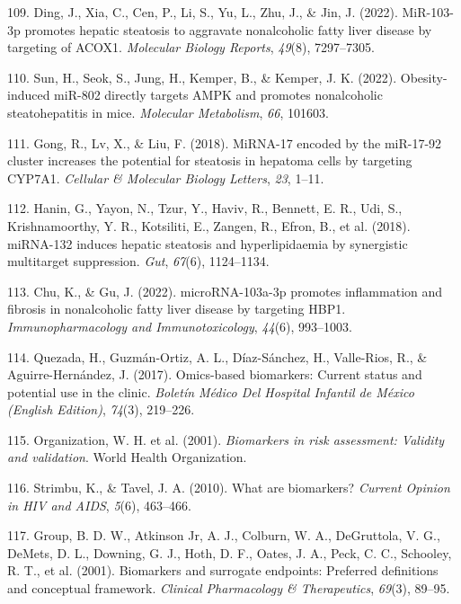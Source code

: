 \documentclass[
  11pt,
  letterpaper,
]{book}
\newlength{\cslhangindent}
\newenvironment{CSLReferences}[2] %
 {\begin{list}{}{%
  \setlength{\itemindent}{0pt}
  \setlength{\leftmargin}{0pt}
  \setlength{\parsep}{0pt}
  \ifodd #1
   \setlength{\leftmargin}{\cslhangindent}
   \setlength{\itemindent}{-1\cslhangindent}
  \fi
  \setlength{\itemsep}{#2\baselineskip}}}
 {\end{list}}
\begin{document}
\begin{CSLReferences}{1}{0}
109. Ding, J., Xia, C., Cen, P., Li, S., Yu, L., Zhu, J., \& Jin, J.
(2022). MiR-103-3p promotes hepatic steatosis to aggravate nonalcoholic
fatty liver disease by targeting of ACOX1. \emph{Molecular Biology
Reports}, \emph{49}(8), 7297--7305.

110. Sun, H., Seok, S., Jung, H., Kemper, B., \& Kemper, J. K. (2022).
Obesity-induced miR-802 directly targets AMPK and promotes nonalcoholic
steatohepatitis in mice. \emph{Molecular Metabolism}, \emph{66}, 101603.

111. Gong, R., Lv, X., \& Liu, F. (2018). MiRNA-17 encoded by the
miR-17-92 cluster increases the potential for steatosis in hepatoma
cells by targeting CYP7A1. \emph{Cellular \& Molecular Biology Letters},
\emph{23}, 1--11.

112. Hanin, G., Yayon, N., Tzur, Y., Haviv, R., Bennett, E. R., Udi, S.,
Krishnamoorthy, Y. R., Kotsiliti, E., Zangen, R., Efron, B., et al.
(2018). miRNA-132 induces hepatic steatosis and hyperlipidaemia by
synergistic multitarget suppression. \emph{Gut}, \emph{67}(6),
1124--1134.

113. Chu, K., \& Gu, J. (2022). microRNA-103a-3p promotes inflammation
and fibrosis in nonalcoholic fatty liver disease by targeting HBP1.
\emph{Immunopharmacology and Immunotoxicology}, \emph{44}(6), 993--1003.

114. Quezada, H., Guzmán-Ortiz, A. L., Díaz-Sánchez, H., Valle-Rios, R.,
\& Aguirre-Hernández, J. (2017). Omics-based biomarkers: Current status
and potential use in the clinic. \emph{Boletín Médico Del Hospital
Infantil de México (English Edition)}, \emph{74}(3), 219--226.

115. Organization, W. H. et al. (2001). \emph{Biomarkers in risk
assessment: Validity and validation}. World Health Organization.

116. Strimbu, K., \& Tavel, J. A. (2010). What are biomarkers?
\emph{Current Opinion in HIV and AIDS}, \emph{5}(6), 463--466.

117. Group, B. D. W., Atkinson Jr, A. J., Colburn, W. A., DeGruttola, V.
G., DeMets, D. L., Downing, G. J., Hoth, D. F., Oates, J. A., Peck, C.
C., Schooley, R. T., et al. (2001). Biomarkers and surrogate endpoints:
Preferred definitions and conceptual framework. \emph{Clinical
Pharmacology \& Therapeutics}, \emph{69}(3), 89--95.


\end{CSLReferences}
\end{document}
